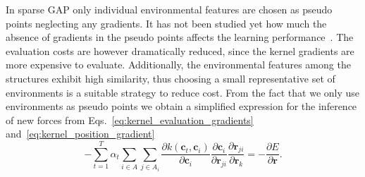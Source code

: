 In sparse GAP only individual environmental features are chosen as pseudo points neglecting any gradients. %
It has not been studied yet how much the absence of gradients in the pseudo points affects the learning performance~\cite{ceriotti2020machine}.
The evaluation costs are however dramatically reduced, since the kernel gradients are more expensive to evaluate. %
Additionally, the environmental features among the structures exhibit high similarity, thus choosing a small representative set of environments is a suitable strategy to reduce cost.
From the fact that we only use environments as pseudo points we obtain a simplified expression for the inference of new forces from Eqs.~\eqref{eq:kernel_evaluation_gradients} and~\eqref{eq:kernel_position_gradient}
\begin{equation}
  \label{eq:force_eval_pseudo_points}
  -\sum_{t=1}^T \alpha_t \sum_{i\in A}\sum_{j\in A_i} \frac{\partial k(\mathbf{c}_{t}, \mathbf{c}_{i})}{\partial\mathbf{c}_{i}} \frac{\partial\mathbf{c}_{i}}{\partial\mathbf{r}_{ji}} \frac{\partial\mathbf{r}_{ji}}{\partial\mathbf{r}_k} = -\frac{\partial E}{\partial \mathbf{r}}. 
\end{equation}
